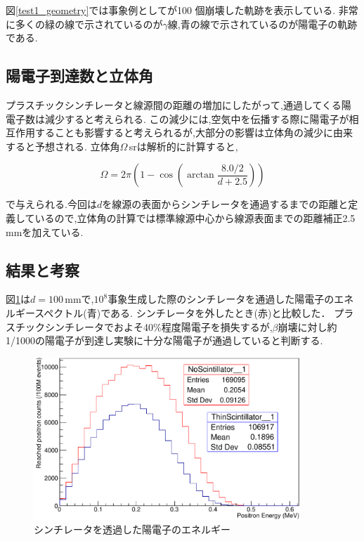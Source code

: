 図\ref{test1_geometry}では事象例としてが100 個崩壊した軌跡を表示している.
非常に多くの緑の線で示されているのが$\gamma$線,青の線で示されているのが陽電子の軌跡である.

\subsection{陽電子到達数と立体角}

プラスチックシンチレータと線源間の距離の増加にしたがって,通過してくる陽電子数は減少すると考えられる.
この減少には,空気中を伝播する際に陽電子が相互作用することも影響すると考えられるが,大部分の影響は立体角の減少に由来すると予想される.
立体角$\Omega$\,srは解析的に計算すると,

\begin{equation}
	\nonumber
	\Omega = 2\pi \left( 1-\cos\left(\arctan\frac{8.0/2}{d+2.5}\right)\right)
\end{equation}

で与えられる.今回は$d$を線源の表面からシンチレータを通過するまでの距離と定義しているので,立体角の計算では標準線源中心から線源表面までの距離補正2.5 mmを加えている.

\subsection{結果と考察}

図\ref{test1}は$d=100$\,mmで,$10^8$事象生成した際のシンチレータを通過した陽電子のエネルギースペクトル(青)である. シンチレータを外したとき(赤)と比較した．
プラスチックシンチレータでおよそ40\%程度陽電子を損失するが,$\beta$崩壊に対し約1/1000の陽電子が到達し実験に十分な陽電子が通過していると判断する.

\begin{figure}[!tbp]
	\centering
		\includegraphics[width=10cm]{fig/test1.pdf}
	\caption{シンチレータを透過した陽電子のエネルギー}
	\label{test1}
\end{figure}


